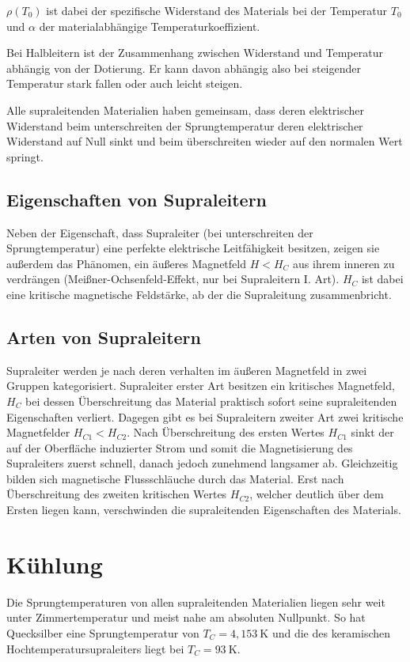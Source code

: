 \documentclass[bigchapter,colorback,accentcolor=tud4b,linedtoc,11pt]{tudreport}
\numberwithin{equation}{subsection}
\begin{document}
\(\rho(T_0)\) ist dabei der spezifische Widerstand des Materials bei der Temperatur \(T_0\) und \(\alpha\) der materialabhängige Temperaturkoeffizient.

Bei Halbleitern ist der Zusammenhang zwischen Widerstand und Temperatur abhängig von der Dotierung. Er kann davon abhängig also bei steigender Temperatur stark fallen oder auch leicht steigen.

Alle supraleitenden Materialien haben gemeinsam, dass deren elektrischer Widerstand beim unterschreiten der Sprungtemperatur deren elektrischer Widerstand auf Null sinkt und beim überschreiten wieder auf den normalen Wert springt.

\subsection{Eigenschaften von Supraleitern}
Neben der Eigenschaft, dass Supraleiter (bei unterschreiten der Sprungtemperatur) eine perfekte elektrische Leitfähigkeit besitzen, zeigen sie außerdem das Phänomen, ein äußeres Magnetfeld \(H < H_C\) aus ihrem inneren zu verdrängen (Meißner-Ochsenfeld-Effekt, nur bei Supraleitern I. Art). \(H_C\) ist dabei eine kritische magnetische Feldstärke, ab der die Supraleitung zusammenbricht.

\subsection{Arten von Supraleitern}
Supraleiter werden je nach deren verhalten im äußeren Magnetfeld in zwei Gruppen kategorisiert. Supraleiter erster Art besitzen ein kritisches Magnetfeld, $H_C$ bei dessen Überschreitung das Material praktisch sofort seine supraleitenden Eigenschaften verliert. Dagegen gibt es bei Supraleitern zweiter Art zwei kritische Magnetfelder $H_{C1} < H_{C2}$. Nach Überschreitung des ersten Wertes $H_{C1}$ sinkt der auf der Oberfläche induzierter Strom und somit die Magnetisierung des Supraleiters zuerst schnell, danach jedoch zunehmend langsamer ab. Gleichzeitig bilden sich magnetische Flussschläuche durch das Material. Erst nach Überschreitung des zweiten kritischen Wertes $H_{C2}$, welcher deutlich über dem Ersten liegen kann, verschwinden die supraleitenden Eigenschaften des Materials.

\section{Kühlung}
Die Sprungtemperaturen von allen supraleitenden Materialien liegen sehr weit unter Zimmertemperatur und meist nahe am absoluten Nullpunkt. So hat Quecksilber eine Sprungtemperatur von \(T_C = 4,153 \ \mathrm{K}\) und die des keramischen Hochtemperatursupraleiters  liegt bei \(T_C = 93 \ \mathrm{K}\).
\end{document}
